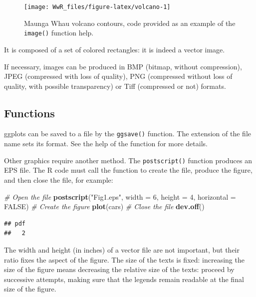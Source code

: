 \documentclass[
  12pt,
  american,
  a4paper,
  extrafontsizes,onecolumn,openright
  ]{memoir}
\newenvironment{Shaded}{\begin{snugshade}}{\end{snugshade}}
\newcommand{\AttributeTok}[1]{\textcolor[rgb]{0.13,0.29,0.53}{#1}}
\newcommand{\CommentTok}[1]{\textcolor[rgb]{0.56,0.35,0.01}{\textit{#1}}}
\newcommand{\ConstantTok}[1]{\textcolor[rgb]{0.56,0.35,0.01}{#1}}
\newcommand{\DecValTok}[1]{\textcolor[rgb]{0.00,0.00,0.81}{#1}}
\newcommand{\FunctionTok}[1]{\textcolor[rgb]{0.13,0.29,0.53}{\textbf{#1}}}
\newcommand{\NormalTok}[1]{#1}
\newcommand{\StringTok}[1]{\textcolor[rgb]{0.31,0.60,0.02}{#1}}
\begin{document}
\begin{figure}

{\centering \texttt{[image: WwR\_files/figure-latex/volcano-1]} 

}

\caption{Maunga Whau volcano contours, code provided as an example of the \texttt{image()} function help.}\label{fig:volcano}
\end{figure}

\normalsize

It is composed of a set of colored rectangles: it is indeed a vector image.

If necessary, images can be produced in BMP (bitmap, without compression), JPEG (compressed with loss of quality), PNG (compressed without loss of quality, with possible transparency) or Tiff (compressed or not) formats.

\subsection{Functions}\label{functions}

ggplots can be saved to a file by the \texttt{ggsave()} function.
The extension of the file name sets its format.
See the help of the function for more details.

Other graphics require another method.
The \texttt{postscript()} function produces an EPS file.
The R code must call the function to create the file, produce the figure, and then close the file, for example:

\scriptsize

\begin{Shaded}
\begin{Highlighting}[]
\CommentTok{\# Open the file}
\FunctionTok{postscript}\NormalTok{(}\StringTok{"Fig1.eps"}\NormalTok{, }\AttributeTok{width =} \DecValTok{6}\NormalTok{, }\AttributeTok{height =} \DecValTok{4}\NormalTok{, }\AttributeTok{horizontal =} \ConstantTok{FALSE}\NormalTok{)}
\CommentTok{\# Create the figure}
\FunctionTok{plot}\NormalTok{(cars)}
\CommentTok{\# Close the file}
\FunctionTok{dev.off}\NormalTok{()}
\end{Highlighting}
\end{Shaded}

\begin{verbatim}
## pdf 
##   2
\end{verbatim}

\normalsize

The width and height (in inches) of a vector file are not important, but their ratio fixes the aspect of the figure.
The size of the texts is fixed: increasing the size of the figure means decreasing the relative size of the texts: proceed by successive attempts, making sure that the legends remain readable at the final size of the figure.
\end{document}
